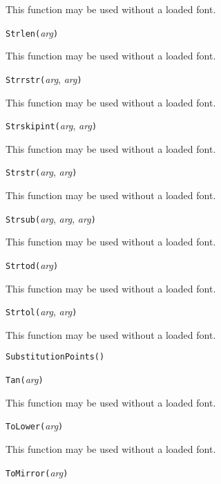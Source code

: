 This function may be used without a loaded font.


\noindent\texttt{Strlen(}\textit{arg}\texttt{)}

This function may be used without a loaded font.


\noindent\texttt{Strrstr(}\textit{arg}, \textit{arg}\texttt{)}

This function may be used without a loaded font.


\noindent\texttt{Strskipint(}\textit{arg}, \textit{arg}\texttt{)}

This function may be used without a loaded font.


\noindent\texttt{Strstr(}\textit{arg}, \textit{arg}\texttt{)}

This function may be used without a loaded font.


\noindent\texttt{Strsub(}\textit{arg}, \textit{arg}, \textit{arg}\texttt{)}

This function may be used without a loaded font.


\noindent\texttt{Strtod(}\textit{arg}\texttt{)}

This function may be used without a loaded font.


\noindent\texttt{Strtol(}\textit{arg}, \textit{arg}\texttt{)}

This function may be used without a loaded font.


\noindent\texttt{SubstitutionPoints(}\texttt{)}


\noindent\texttt{Tan(}\textit{arg}\texttt{)}

This function may be used without a loaded font.


\noindent\texttt{ToLower(}\textit{arg}\texttt{)}

This function may be used without a loaded font.


\noindent\texttt{ToMirror(}\textit{arg}\texttt{)}

